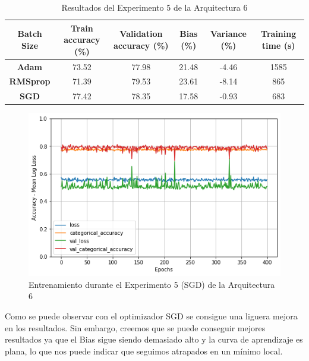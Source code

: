 \documentclass{article}
\begin{document}
    
   
   \begin{table}[!h]
				\begin{center}
					\begin{tabular}{ c | c | c | c | c | c |}
						 \textbf{Batch Size} & \textbf{Train accuracy (\%)} & \textbf{Validation accuracy (\%)} & \textbf{Bias (\%)} & \textbf{Variance (\%)} & \textbf{Training time (s)} \\ \hline
						\textbf{Adam } & 73.52   &77.98 &  21.48 & -4.46  &1585    \\ \hline
                        \textbf{RMSprop } & 71.39   &79.53  & 23.61  & -8.14  &  865   \\ \hline
                        \textbf{SGD} &  77.42   &  78.35& 17.58 & -0.93 &   683  \\ \hline
					\end{tabular}
					\caption{Resultados del Experimento 5 de la Arquitectura 6}
					\label{tab:res-a2-e5}
				\end{center}
			\end{table}
   
   \begin{figure}[!h]
				\begin{center}
					\includegraphics[scale=0.5]{Images/tr-a6-e5(SGD).png}		
					\caption{Entrenamiento durante el Experimento 5 (SGD) de la Arquitectura 6}	
					\label{tab:tr-a6-e2}
				\end{center}
			\end{figure}
   
   Como se puede observar con el optimizador SGD se consigue una liguera mejora en los resultados. Sin embargo, creemos que se puede conseguir mejores resultados ya que el Bias sigue siendo demasiado alto y la curva de aprendizaje es plana, lo que nos puede indicar que seguimos atrapados en un mínimo local. 
\end{document}

